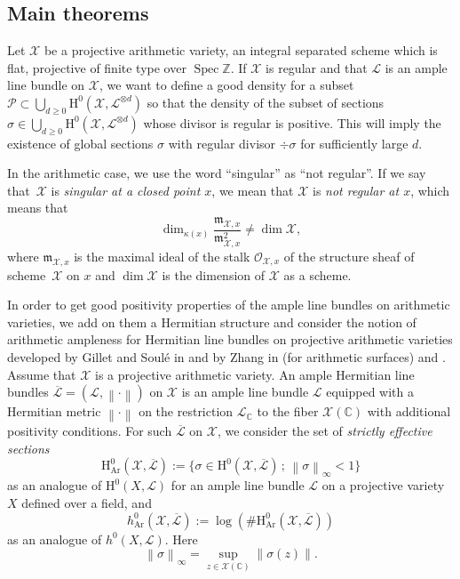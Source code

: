 \documentclass[JEP,XML,SOM,Unicode,published]{cedram}
\newcommand{\sep}{\,;\,}
\theoremstyle{plain}
\theoremstyle{definition}
\newcommand{\ho}{\mathrm{H}}
\newcommand{\X}{\mathcal{X}}
\newcommand{\Li}{\overline{\mathcal{L}}{}}
\newcommand{\li}{\mathcal{L}}
\newcommand{\Z}{\mathbb{Z}}
\newcommand{\bbC}{\mathbb{C}}
\DeclareMathOperator{\Spec}{Spec}
\begin{document}
\subsection{Main theorems}

Let $\X$ be a projective arithmetic variety, \ie an integral separated scheme which is flat, projective of finite type over $\Spec \Z$. If $\X$ is regular and that $\li$ is an ample line bundle on $\X$, we want to define a good density for a subset $\mathcal{P}\subset \bigcup_{d\geq 0}\ho^{0}(\X,\li^{\otimes d})$ so that the density of the subset of sections $\sigma\in \bigcup_{d\geq 0}\ho^{0}(\X,\li^{\otimes d})$ whose divisor is regular is positive. This will imply the existence of global sections $\sigma$ with regular divisor $\div \sigma$ for sufficiently large $d$.

In the arithmetic case, we use the word ``singular'' as ``not regular''. If we say that~$\X$ is \emph{singular at a closed point $x$}, we mean that $\X$ is \emph{not regular at $x$}, which means that
\[
\dim_{\kappa(x)} \frac{\mathfrak{m}_{\X, x}}{\mathfrak{m}^2_{\X, x}}\not=\dim \X,
\]
where $\mathfrak{m}_{\X, x}$ is the maximal ideal of the stalk $\mathcal{O}_{\X, x}$ of the structure sheaf of scheme~$\X$ on $x$ and $\dim\X$ is the dimension of $\X$ as a scheme.

In order to get good positivity properties of the ample line bundles on arithmetic varieties, we add on them a Hermitian structure and consider the notion of arithmetic ampleness for Hermitian line bundles on projective arithmetic varieties developed by Gillet and Soulé in \cite{GS92} and by Zhang in \cite{Zh92} (for arithmetic surfaces) and \cite{Zh95}. Assume that $\X$ is a projective arithmetic variety. An ample Hermitian line bundles $\Li=(\li, \left\lVert \cdot \right\rVert)$ on $\X$ is an ample line bundle $\li$ equipped with a Hermitian metric $\left\lVert \cdot \right\rVert$ on the restriction $\li_{\bbC}$ to the fiber $\X(\bbC)$ with additional positivity conditions. For such $\Li$ on $\X$, we consider the set of \emph{strictly effective sections}
\[
\ho_{\mathrm{Ar}}^0(\X, \Li):= \{ \sigma\in \ho^0(\X, \Li) \sep \left\lVert \sigma \right\rVert_{\infty}<1 \}
\]
as an analogue of $\ho^0(X,\li)$ for an ample line bundle $\li$ on a projective variety $X$ defined over a field, and
\[
h_{\mathrm{Ar}}^0(\X, \Li):= \log\left(\#\ho_{\mathrm{Ar}}^0(\X, \Li) \right)
\]
as an analogue of $h^0(X,\li)$. Here
\[
\left\lVert \sigma \right\rVert_{\infty}=\sup_{z\in \X(\bbC)}\lVert \sigma(z)\rVert.
\]
\end{document}
